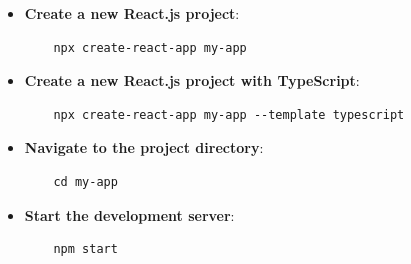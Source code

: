 \begin{itemize}
    \item \textbf{Create a new React.js project}:
    \begin{verbatim}
    npx create-react-app my-app
    \end{verbatim}

    \vspace{-4.5mm}
    
    \item \textbf{Create a new React.js project with TypeScript}:
    \begin{verbatim}
    npx create-react-app my-app --template typescript
    \end{verbatim}

    \vspace{-4.5mm}
    
    \item \textbf{Navigate to the project directory}:
    \begin{verbatim}
    cd my-app
    \end{verbatim}
    
    \vspace{-4.5mm}
    
    \item \textbf{Start the development server}:
    \begin{verbatim}
    npm start
    \end{verbatim}
\end{itemize}

\vspace{-10mm}

